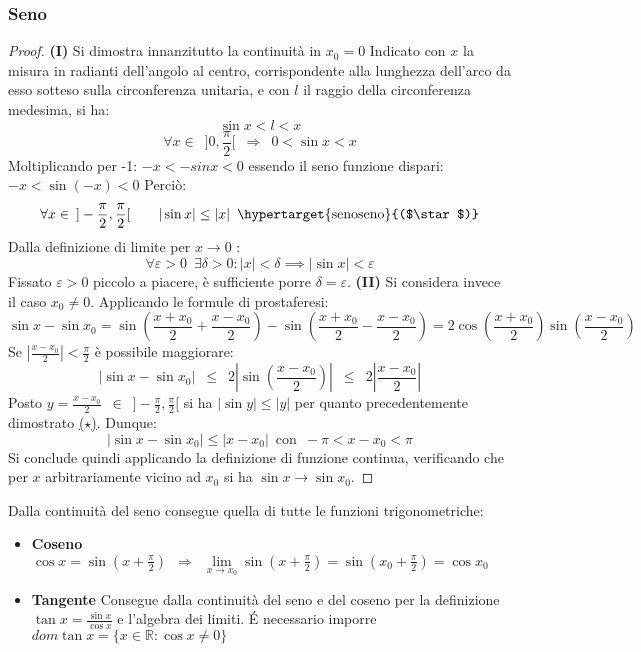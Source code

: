\documentclass[10pt, oneside]{book}
\theoremstyle{plain}
\begin{document}
\subsubsection{Seno}
\begin{proof}
\textbf{(I)} Si dimostra innanzitutto la continuità in $x_0 = 0$ \newline 
Indicato con $x$ la misura in radianti dell'angolo al centro, corrispondente alla lunghezza dell'arco da esso sotteso sulla circonferenza unitaria, e con $l$ il raggio della circonferenza medesima, si ha:
\[\sin x < l < x\]
\[\forall x \in \enspace ]0,\frac{\pi}{2}[ \enspace \Longrightarrow \enspace 0 < \sin x < x\]
Moltiplicando per -1: $-x < -sinx < 0$ essendo il seno funzione dispari: $-x < \sin (-x) < 0$ Perciò:
\[\forall x \in \enspace ]-\frac{\pi}{2}, \frac{\pi}{2}[ \quad \quad |\sin x| \leq |x| \enspace \textrm{\hypertarget{senoseno}{($\star$)}} \]
Dalla definizione di limite per $x \longrightarrow 0$ :
\[\forall \varepsilon >0 \enspace \exists \delta > 0 : |x| < \delta \implies |\sin x| < \varepsilon\]
Fissato $\varepsilon > 0$ piccolo a piacere, è sufficiente porre $\delta = \varepsilon$. \newline
\textbf{(II)} Si considera invece il caso $x_0 \neq 0$. Applicando le formule di prostaferesi:
\[\sin x - \sin x_0 = \sin (\frac{x + x_0}{2} + \frac{x - x_0}{2}) - \sin (\frac{x + x_0}{2} - \frac{x - x_0}{2}) = 2 \cos (\frac{x + x_0}{2}) \sin (\frac{x - x_0}{2})\]
Se $|\frac{x - x_0}{2}| < \frac{\pi}{2}$ è possibile maggiorare:
\[|\sin x - \sin x_0| \enspace \leq \enspace 2 |\sin (\frac{x - x_0}{2})| \enspace \leq \enspace 2|\frac{x - x_0}{2}|\]
Posto $y = \frac{x - x_0}{2} \enspace \in \enspace ]-\frac{\pi}{2}, \frac{\pi}{2}[$ si ha $|\sin y| \leq |y|$ per quanto precedentemente dimostrato \hyperlink{senoseno}{($\star$)}. Dunque:
\[|\sin x - \sin x_0| \leq |x - x_0| \enspace \textrm{con} \enspace -\pi < x - x_0 < \pi\]
Si conclude quindi applicando la definizione di funzione continua, verificando che per $x$ arbitrariamente vicino ad $x_0$ si ha $\sin x \longrightarrow \sin x_0$.
\end{proof}
Dalla continuità del seno consegue quella di tutte le funzioni trigonometriche:
\begin{itemize}[label=$\ast$]
\item \textbf{Coseno} $\cos x = \sin (x + \frac{\pi}{2}) \enspace \Rightarrow \enspace \lim \limits_{x \rightarrow x_0} \sin (x + \frac{\pi}{2}) = \sin (x_0 + \frac{\pi}{2}) = \cos x_0$
\item \textbf{Tangente} Consegue dalla continuità del seno e del coseno per la definizione $\tan x = \frac{\sin x}{\cos x}$ e l'algebra dei limiti. \'E necessario imporre $dom \tan x = \{x \in \mathbb{R} : \cos x \neq 0\}$
\end{itemize}
\end{document}
